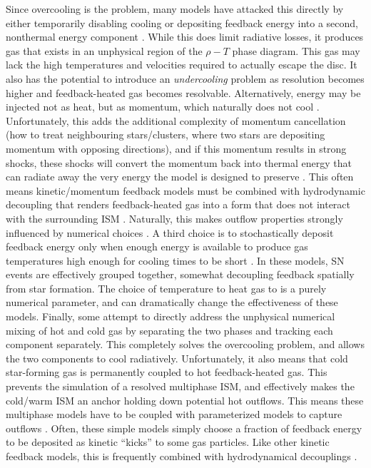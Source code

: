 Since overcooling is the problem, many models have attacked this directly by
either temporarily disabling cooling \citep{Thacker2000,Stinson2006} or
depositing feedback energy into a second, nonthermal energy component
\citep{Agertz2013}.  While this does limit radiative losses, it produces gas
that exists in an unphysical region of the $\rho-T$ phase diagram.  This gas may
lack the high temperatures and velocities required to actually escape the disc.
It also has the potential to introduce an \textit{undercooling} problem as
resolution becomes higher and feedback-heated gas becomes resolvable.
Alternatively, energy may be injected not as heat, but as momentum, which
naturally does not cool
\citep{Navarro1993,Mihos1994,Scannapieco2006,DallaVecchia2008,Dubois2008}.
Unfortunately, this adds the additional complexity of momentum cancellation (how
to treat neighbouring stars/clusters, where two stars are depositing momentum
with opposing directions), and if this momentum results in strong shocks, these
shocks will convert the momentum back into thermal energy that can radiate
away the very energy the model is designed to preserve \citep{Durier2012}.
This often means kinetic/momentum feedback models must be combined with
hydrodynamic decoupling that renders feedback-heated gas into a form that does
not interact with the surrounding ISM \citep{Springel2003,Vogelsberger2013}.
Naturally, this makes outflow properties strongly influenced by numerical
choices \citep{DallaVecchia2008}.  A third choice is to stochastically deposit
feedback energy only when enough energy is available to produce gas temperatures
high enough for cooling times to be short \citep{DallaVecchia2012,Crain2015}.
In these models, SN events are effectively grouped together, somewhat decoupling
feedback spatially from star formation.  The choice of temperature to heat gas
to is a purely numerical parameter, and can dramatically change the
effectiveness of these models.  Finally, some \citep{Springel2003,Murante2015}
attempt to directly address the unphysical numerical mixing of hot and cold gas
by separating the two phases and tracking each component separately.  This
completely solves the overcooling problem, and allows the two components to cool
radiatively.   Unfortunately, it also means that cold star-forming gas is
permanently coupled to hot feedback-heated gas. This prevents the simulation of a
resolved multiphase ISM, and effectively makes the cold/warm ISM an anchor
holding down potential hot outflows.  This means these multiphase models have to
be coupled with parameterized models to capture outflows \citep{Springel2003}.
Often, these simple models simply choose a fraction of feedback energy to be
deposited as kinetic ``kicks'' to some gas particles.  Like other kinetic
feedback models, this is frequently combined with hydrodynamical decouplings
\citep{Vogelsberger2013}.


